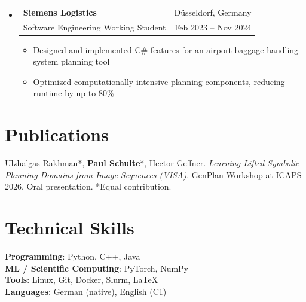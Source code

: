 \documentclass[letterpaper,11pt]{article}
\makeatletter
\newcommand{\resumeItem}[1]{
  \item\small{
    {#1 \vspace{-3pt}}
  }
}
\newcommand{\resumeSubheading}[4]{
  \vspace{-2pt}\item
    \begin{tabular*}{0.97\textwidth}[t]{l@{\extracolsep{\fill}}r}
      #1 & #2 \\
      \small#3 & \small#4
    \end{tabular*}\vspace{-8pt}
}
\newcommand{\resumeProjectHeading}[2]{
    \item
    \begin{tabular*}{0.97\textwidth}{l@{\extracolsep{\fill}}r}
      \small#1 & #2 \\
    \end{tabular*}\vspace{-7pt}
}
\newcommand{\resumeSubHeadingListStart}{\begin{itemize}[leftmargin=0.15in, label={}]}
\newcommand{\resumeSubHeadingListEnd}{\end{itemize}}
\newcommand{\resumeItemListStart}{\begin{itemize}}
\newcommand{\resumeItemListEnd}{\end{itemize}\vspace{-7pt}}
\makeatother
\begin{document}
\resumeSubHeadingListStart
\resumeSubheading
    {\textbf{Siemens Logistics}}{Düsseldorf, Germany}
    {Software Engineering Working Student}{Feb 2023 -- Nov 2024}
\resumeItemListStart
    \resumeItem{Designed and implemented C\# features for an airport baggage handling system planning tool}
    \resumeItem{Optimized computationally intensive planning components, reducing runtime by up to 80\%}
\resumeItemListEnd
\resumeSubHeadingListEnd

\section{Publications}

\begin{itemize}[leftmargin=0.15in, label={}]
\small{
\item{
Ulzhalgas Rakhman*, \textbf{Paul Schulte}*, Hector Geffner.
\textit{Learning Lifted Symbolic Planning Domains from Image Sequences (VISA)}.
GenPlan Workshop at ICAPS 2026. Oral presentation. *Equal contribution.
}}
\end{itemize}

\section{Technical Skills}

\begin{itemize}[leftmargin=0.15in, label={}]
\small{
\item{
\textbf{Programming}: Python, C++, Java \\
\textbf{ML / Scientific Computing}: PyTorch, NumPy \\
\textbf{Tools}: Linux, Git, Docker, Slurm, \LaTeX \\
\textbf{Languages}: German (native), English (C1)
}}
\end{itemize}
\end{document}
